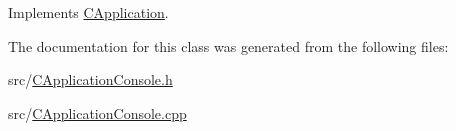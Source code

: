 Implements \hyperlink{classCApplication_a741354ef7eba83ea594a116069dafddd}{C\+Application}.



The documentation for this class was generated from the following files\+:\begin{DoxyCompactItemize}
\item 
src/\hyperlink{CApplicationConsole_8h}{C\+Application\+Console.\+h}\item 
src/\hyperlink{CApplicationConsole_8cpp}{C\+Application\+Console.\+cpp}\end{DoxyCompactItemize}
